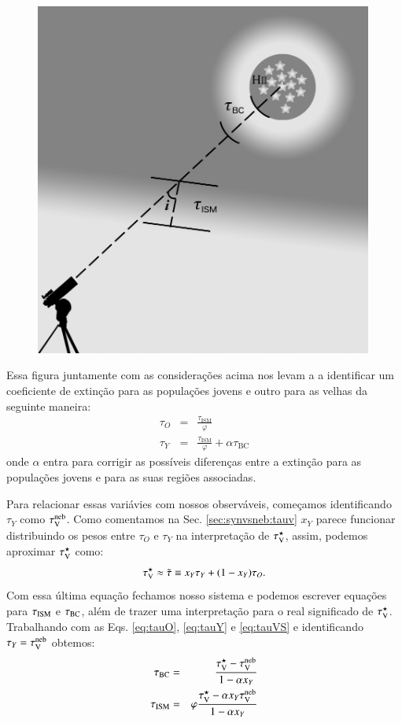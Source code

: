 \begin{figure}
	\includegraphics[width=0.99\textwidth]{figuras/Hiiregion_model.png}
	\caption[Modelo para extinção diferencial.]
	{}
	\label{fig:model}
\end{figure}

Essa figura juntamente com as considerações acima nos levam a a identificar um coeficiente de
extinção para as populações jovens e outro para as velhas da seguinte maneira:
\begin{eqnarray}
	\tau_O &=& \frac{\tau_{\mathrm{ISM}}}{\varphi} \\
	\label{eq:tauO}
	\tau_Y &=& \frac{\tau_{\mathrm{ISM}}}{\varphi} + \alpha\tau_{\mathrm{BC}}
	\label{eq:tauY} 
\end{eqnarray}
\noindent onde $\alpha$ entra para corrigir as possíveis diferenças entre a extinção para as
populações jovens e para as suas regiões \Hii associadas.

Para relacionar essas variávies com nossos observáveis, começamos identificando $\tau_Y$ como
$\tau_{\mathrm{V}}^{\mathrm{neb}}$. Como comentamos na Sec. \ref{sec:synvsneb:tauv} $x_Y$ parece funcionar distribuindo os
pesos entre $\tau_O$ e $\tau_Y$ na interpretação de $\tau_{\mathrm{V}}^\star$, assim, podemos aproximar $\tau_{\mathrm{V}}^\star$
como:
\begin{equation}
	\tau_{\mathrm{V}}^\star \approx \tilde{\tau} \equiv x_Y \tau_Y + (1 - x_Y) \tau_O.
	\label{eq:tauVS}
\end{equation}
Com essa última equação fechamos nosso sistema e podemos escrever equações para $\tau_{\mathrm{ISM}}$ e
$\tau_{\mathrm{BC}}$, além de trazer uma interpretação para o real significado de $\tau_{\mathrm{V}}^\star$. Trabalhando com as
Eqs. \ref{eq:tauO}, \ref{eq:tauY} e \ref{eq:tauVS} e identificando $\tau_Y = \tau_{\mathrm{V}}^{\mathrm{neb}}$ obtemos:  
\begin{eqnarray}
	\tau_{\mathrm{BC}} &=& \frac{\tau_{\mathrm{V}}^\star - \tau_{\mathrm{V}}^{\mathrm{neb}}}{1 - \alpha x_Y} \\
	\label{eq:tauBC}
	\tau_{\mathrm{ISM}} &=& \varphi\frac{\tau_{\mathrm{V}}^\star - \alpha x_Y \tau_{\mathrm{V}}^{\mathrm{neb}}}{1 - \alpha x_Y}  
	\label{eq:tauISM}
\end{eqnarray}

